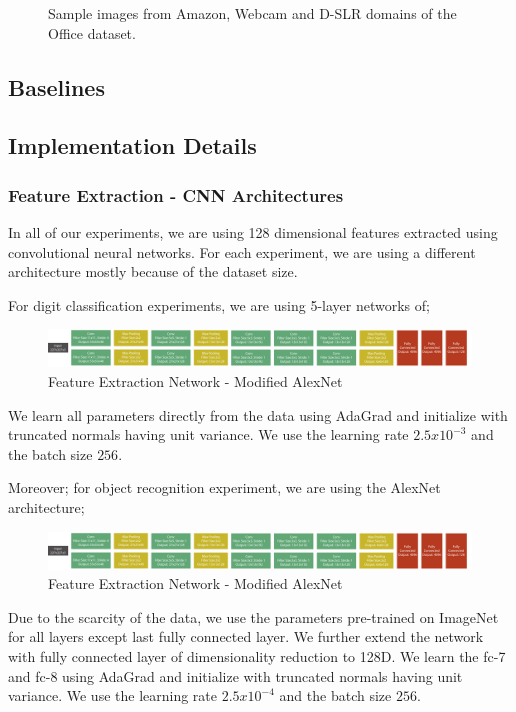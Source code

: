 \begin{figure}
\caption{Sample images from Amazon, Webcam and D-SLR domains of the Office dataset.}
\end{figure}


\subsection{Baselines}
\subsection{Implementation Details}
\subsubsection{Feature Extraction - CNN Architectures}
In all of our experiments, we are using 128 dimensional features extracted using convolutional neural networks. For each experiment, we are using a different architecture mostly because of the dataset size.

For digit classification experiments, we are using 5-layer networks of;
\begin{figure}[h]
\includegraphics[width=\columnwidth]{alexnet}
\caption{Feature Extraction Network - Modified AlexNet}
\end{figure}
We learn all parameters directly from the data using AdaGrad\cite{adagrad} and initialize with truncated normals having unit variance. We use the learning rate $2.5x10^{-3}$ and the batch size $256$.

Moreover; for object recognition experiment, we are using the AlexNet architecture\cite{alexnet};
\begin{figure}[h]
\includegraphics[width=\columnwidth]{alexnet}
\caption{Feature Extraction Network - Modified AlexNet}
\end{figure}
Due to the scarcity of the data, we use the parameters pre-trained on ImageNet for all layers except  last fully connected layer. We further extend the network with fully connected layer of dimensionality reduction to 128D. We learn the fc-7 and fc-8 using AdaGrad\cite{adagrad} and initialize with truncated normals having unit variance. We use the learning rate $2.5x10^{-4}$ and the batch size $256$. 

